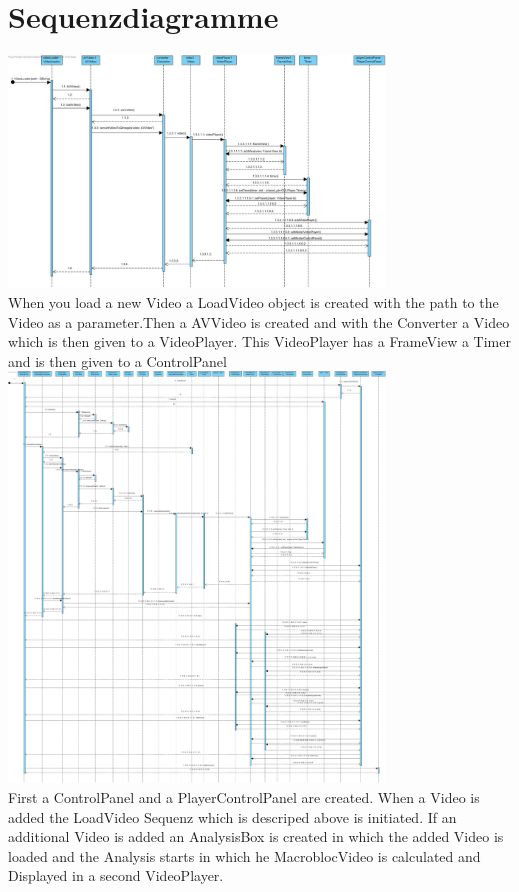 \documentclass[twoside]{book}
\newcommand{\+}{\discretionary{\mbox{\scriptsize$\hookleftarrow$}}{}{}}
\begin{document}
\section{Sequenzdiagramme}
{\centering\includegraphics[width=10cm]{Sequence Diagram1.jpg}}\\
When you load a new Video a LoadVideo object is created with the path to the Video as a parameter.Then a AVVideo is created and with the Converter a Video which is then given to a VideoPlayer. This VideoPlayer has a FrameView a Timer and is then given to a ControlPanel
\newpage
{\centering\includegraphics[width=10cm]{Sequence Diagram2.jpg}}\\
First a ControlPanel and a PlayerControlPanel are created. When a Video is added the LoadVideo Sequenz which is descriped above is initiated.  If an additional Video is added  
an AnalysisBox is created in which the added Video is loaded and the Analysis starts in which he MacroblocVideo is calculated and Displayed in a second VideoPlayer.
\end{document}
